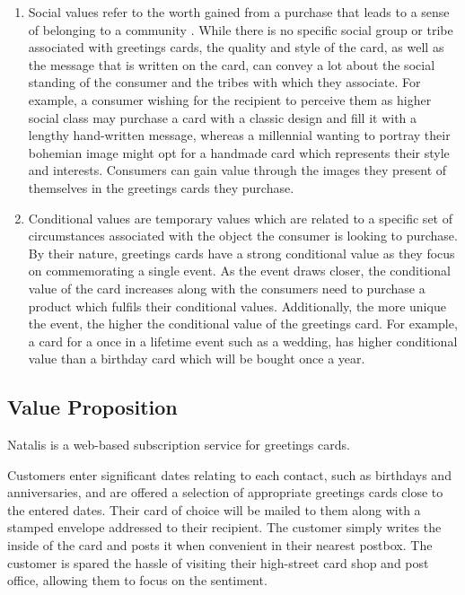 \documentclass[10pt, a4paper]{article}
\begin{document}
\begin{enumerate}
  \item Social values refer to the worth gained from a purchase that leads to a sense of belonging to a community \citep{sheth1991we}. While there is no specific social group or tribe \citep{canniford2011manage} associated with greetings cards, the quality and style of the card, as well as the message that is written on the card, can convey a lot about the social standing of the consumer and the tribes with which they associate. For example, a consumer wishing for the recipient to perceive them as higher social class may purchase a card with a classic design and fill it with a lengthy hand-written message, whereas a millennial wanting to portray their bohemian image might opt for a handmade card which represents their style and interests. Consumers can gain value through the images they present of themselves in the greetings cards they purchase.
  \item Conditional values \citep{sheth1991we} are temporary values which are related to a specific set of circumstances associated with the object the consumer is looking to purchase. By their nature, greetings cards have a strong conditional value as they focus on commemorating a single event. As the event draws closer, the conditional value of the card increases along with the consumers need to purchase a product which fulfils their conditional values. Additionally, the more unique the event, the higher the conditional value of the greetings card. For example, a card for a once in a lifetime event such as a wedding, has higher conditional value than a birthday card which will be bought once a year.
\end{enumerate}

\subsection*{Value Proposition}
Natalis is a web-based subscription service for greetings cards.

Customers enter significant dates relating to each contact, such as birthdays and anniversaries, and are offered a selection of appropriate greetings cards close to the entered dates. Their card of choice will be mailed to them along with a stamped envelope addressed to their recipient. The customer simply writes the inside of the card and posts it when convenient in their nearest postbox. The customer is spared the hassle of visiting their high-street card shop and post office, allowing them to focus on the sentiment.
\end{document}
